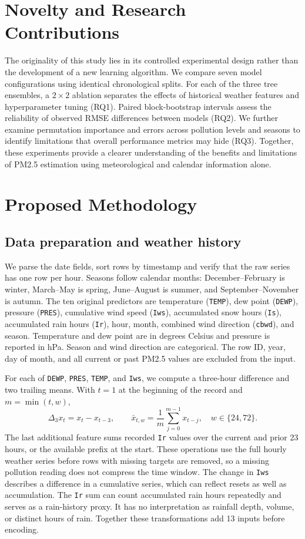 \documentclass[11pt]{article}
\begin{document}
\section{Novelty and Research Contributions}
The originality of this study lies in its controlled experimental design rather than the development of a new learning algorithm. We compare seven model configurations using identical chronological splits. For each of the three tree ensembles, a $2\times2$ ablation separates the effects of historical weather features and hyperparameter tuning (RQ1). Paired block-bootstrap intervals assess the reliability of observed RMSE differences between models (RQ2). We further examine permutation importance and errors across pollution levels and seasons to identify limitations that overall performance metrics may hide (RQ3). Together, these experiments provide a clearer understanding of the benefits and limitations of PM2.5 estimation using meteorological and calendar information alone.

\section{Proposed Methodology}
\subsection{Data preparation and weather history}
We parse the date fields, sort rows by timestamp and verify that the raw series has one row per hour. Seasons follow calendar months: December--February is winter, March--May is spring, June--August is summer, and September--November is autumn. The ten original predictors are temperature (\texttt{TEMP}), dew point (\texttt{DEWP}), pressure (\texttt{PRES}), cumulative wind speed (\texttt{Iws}), accumulated snow hours (\texttt{Is}), accumulated rain hours (\texttt{Ir}), hour, month, combined wind direction (\texttt{cbwd}), and season. Temperature and dew point are in degrees Celsius and pressure is reported in hPa. Season and wind direction are categorical. The row ID, year, day of month, and all current or past PM2.5 values are excluded from the input.

For each of \texttt{DEWP}, \texttt{PRES}, \texttt{TEMP}, and \texttt{Iws}, we compute a three-hour difference and two trailing means. With $t=1$ at the beginning of the record and $m=\min(t,w)$,
\begin{equation}
\Delta_3 x_t=x_t-x_{t-3}, \qquad
\bar x_{t,w}=\frac{1}{m}\sum_{j=0}^{m-1}x_{t-j}, \quad w\in\{24,72\}.
\label{eq:history}
\end{equation}
The last additional feature sums recorded \texttt{Ir} values over the current and prior 23 hours, or the available prefix at the start. These operations use the full hourly weather series before rows with missing targets are removed, so a missing pollution reading does not compress the time window. The change in \texttt{Iws} describes a difference in a cumulative series, which can reflect resets as well as accumulation. The \texttt{Ir} sum can count accumulated rain hours repeatedly and serves as a rain-history proxy. It has no interpretation as rainfall depth, volume, or distinct hours of rain. Together these transformations add 13 inputs before encoding.
\end{document}
